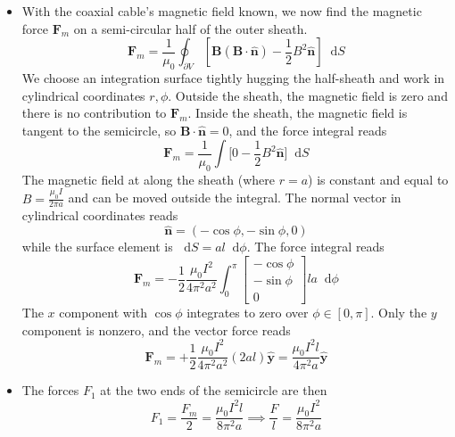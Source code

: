 \documentclass[11pt, a4paper]{article}
\newcommand{\diff}{\mathop{}\!\mathrm{d}} %
\renewcommand{\vec}[1]{\bm{#1}} %
\newcommand{\uvec}[1]{\hat{\vec{#1}}} %
\newcommand{\B}{\vec{B}} %
\begin{document}
\begin{itemize}
	\item With the coaxial cable's magnetic field known, we now find the magnetic force $ \vec{F}_{m} $ on a semi-circular half of the outer sheath.
	\begin{equation*}
		\vec{F}_{m} = \frac{1}{\mu_{0}}\oint_{\partial V}\left [\B(\B \cdot \uvec{n}) - \frac{1}{2}B^{2}\uvec{n}\right ] \diff S
	\end{equation*}
	We choose an integration surface tightly hugging the half-sheath and work in cylindrical coordinates $ r, \phi $. Outside the sheath, the magnetic field is zero and there is no contribution to $ \bm{F}_{m} $. Inside the sheath, the magnetic field is tangent to the semicircle, so $ \vec{B}\cdot \uvec{n} = 0 $, and the force integral reads
	\begin{equation*}
		\vec{F}_{m} = \frac{1}{\mu_{0}} \int \big[0 - \frac{1}{2}B^{2}\uvec{n}\big] \diff S 
	\end{equation*}
	The magnetic field at along the sheath (where $ r = a $) is constant and equal to $ B = \frac{\mu_{0}I}{2\pi a} $ and can be moved outside the integral. The normal vector in cylindrical coordinates reads 
	\begin{equation*}
		\uvec{n} = (- \cos \phi, -\sin \phi, 0)
	\end{equation*} 
	while the surface element is $ \diff S = a l \diff \phi $. The force integral reads
	\begin{equation*}
		\vec{F}_{m} = - \frac{1}{2}\frac{\mu_{0}I^{2}}{4\pi^{2}a^{2}} \int_{0}^{\pi}
		\begin{bmatrix}
			- \cos \phi\\
			 -\sin \phi\\
			  0
		\end{bmatrix}
		l a \diff \phi
	\end{equation*}
	The $ x $ component with $ \cos \phi $ integrates to zero over $ \phi \in [0, \pi] $. Only the $ y $ component is nonzero, and the vector force reads
	\begin{equation*}
	 	\vec{F}_{m} = +\frac{1}{2}\frac{\mu_{0}I^{2}}{4\pi^{2}a^{2}} (2a l)\uvec{y} = \frac{\mu_{0}I^{2}l}{4\pi^{2}a} \uvec{y}
	\end{equation*}
	
	\item The forces $ F_{1} $ at the two ends of the semicircle are then
	\begin{equation*}
		F_{1} = \frac{F_{m}}{2} =  \frac{\mu_{0}I^{2}l}{8\pi^{2}a} \implies \frac{F}{l} = \frac{\mu_{0}I^{2}}{8\pi^{2}a} 
	\end{equation*}
\end{itemize}
\end{document}

